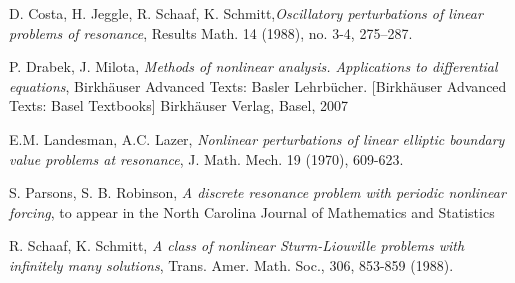 \documentclass[twoside]{article}
\begin{document}
\begin{thebibliography}{99}

 D. Costa, H. Jeggle, R. Schaaf, K. Schmitt,{\em Oscillatory perturbations of linear problems of resonance}, Results Math. 14 (1988), no. 3-4, 275–287.

 P. Drabek, J. Milota, {\em Methods of nonlinear analysis. Applications to differential equations}, Birkhäuser Advanced Texts: Basler Lehrbücher. [Birkhäuser Advanced Texts: Basel Textbooks] Birkhäuser Verlag, Basel, 2007	

 E.M. Landesman, A.C. Lazer, {\em Nonlinear perturbations of linear elliptic boundary value problems at resonance}, J. Math. Mech. 19 (1970), 609-623.

 S. Parsons, S. B. Robinson, \emph{\em A discrete resonance problem with periodic nonlinear forcing}, to appear in the North Carolina Journal of Mathematics and Statistics

		R. Schaaf, K. Schmitt, {\em A class of nonlinear Sturm-Liouville problems with infinitely many solutions}, Trans. Amer. Math. Soc., 306, 853-859 (1988).


\end{thebibliography}%


\label{lastpage} %
\end{document}
